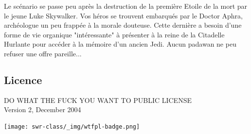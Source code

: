 \documentclass{jdrp}
\begin{document}
    Le scénario se passe peu après la destruction de la première Etoile de la mort par le jeune Luke Skywalker. Vos héros se trouvent embarqués par le Doctor Aphra, archéologue un peu frappée à la morale douteuse. Cette dernière a besoin d’une forme de vie organique "intéressante" à présenter à la reine de la Citadelle Hurlante pour accéder à la mémoire d’un ancien Jedi. Aucun padawan ne peu refuser une offre pareille...

    \vspace*{\fill}

	\subsection{Licence}
	\noindent DO WHAT THE FUCK YOU WANT TO PUBLIC LICENSE\\
    Version 2, December 2004
    \vspace{-2.5\baselineskip}
	\begin{flushright}
		\texttt{[image: swr-class/\_img/wtfpl-badge.png]}
	\end{flushright}

	\twocolumn

	
	
	
    

	\onecolumn
	\nocite{*}
	\printbibliography
\end{document}
